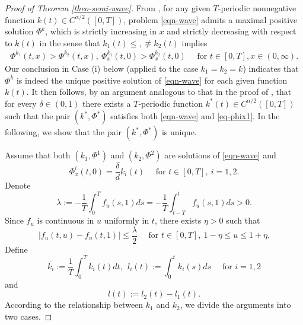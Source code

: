 \documentclass[11pt]{amsart}
\numberwithin{equation}{section}
\begin{document}
\begin{proof}[Proof of Theorem \ref{theo-semi-wave}]
From  \cite[Lemma 3.4]{MDW}, for any given $T$-periodic
nonnegative function $k(t)\in C^{\alpha/2}([0,T])$, problem \eqref{eqn-wave} admits a maximal positive  solution $\Phi^k$, which is strictly increasing in  $x$ and  strictly decreasing  with respect to $k(t)$ in the sense that $k_1(t)\leq, \not\equiv k_2(t) $ implies
\begin{eqnarray*}
  \Phi^{k_1}(t,x)>  \Phi^{k_2}(t,x),~   \Phi_x^{k_1}(t,0)>\Phi_x^{k_2}(t,0)\quad \text{ for }t\in[0,T], x\in(0,\infty).
\end{eqnarray*}
Our conclusion in Case (i) below (applied to the case $k_1=k_2=k$) indicates that $\Phi^k$ is indeed the unique  positive solution of \eqref{eqn-wave} for each given function $k(t)$. It then follows, by an argument analogous to that in the proof of \cite[Lemma~3.5]{MDW}, that for every $\delta\in (0,1)$ there exists a $T$-periodic function $k^*(t)\in C^{\alpha/2}([0,T])$ such that the pair $(k^*,\Phi^*)$ satisfies both \eqref{eqn-wave} and \eqref{eq-phix1}. In the following, we show that the pair $(k^*,\Phi^*)$  is  unique.

 Assume that both  $(k_1,\Phi^1)$ and $(k_2,\Phi^2)$ are solutions of  \eqref{eqn-wave}  and
 \begin{equation}\label{eq-phi12}
    \Phi^i_x(t,0)=\frac{\delta}{d}k_i(t)\quad  \text{ for }t\in[0,T],\ i=1,2.
 \end{equation}
Denote 
\begin{equation*}
  \lambda:=-\frac{1}{T}\int_0^Tf_u(s,1)ds=-\frac{1}{T}\int_{t-T}^{t}f_u(s,1)ds>0.
\end{equation*}
Since  $f_u$ is continuous in $u$ uniformly in $t$, there exists $\eta>0$ such that 
\begin{equation}\label{eq-fu}
      |f_u(t,u)-f_u(t,1)|\leq \frac{\lambda}{2}\quad \text{ for } t\in[0,T],~1-\eta\leq u\leq 1+\eta.
\end{equation}
 Define
\begin{equation*}
  \overline{k_i}:=\frac{1}{T}\int_{0}^{T}k_i(t)dt, ~~l_i(t):=\int_0^tk_i(s)ds \quad \text{ for }i=1,2
\end{equation*}
and 
\begin{equation*}
  l(t):=l_2(t)-l_1(t).
\end{equation*}
According to the relationship between $\overline{k_1}$ and $\overline{k_2}$, we divide the arguments into two cases.


\end{proof}
\end{document}
